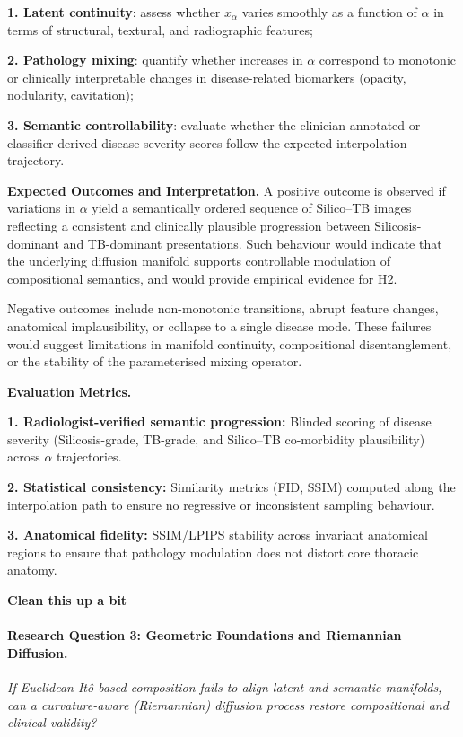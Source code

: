\textbf{1. Latent continuity}: assess whether \(x_{\alpha}\) varies smoothly as a function of \(\alpha\) in terms of structural, textural, and radiographic features;

\textbf{2. Pathology mixing}: quantify whether increases in \(\alpha\) correspond to monotonic or clinically interpretable changes in disease-related biomarkers (opacity, nodularity, cavitation);

\textbf{3. Semantic controllability}: evaluate whether the clinician-annotated or classifier-derived disease severity scores follow the expected interpolation trajectory.

\textbf{Expected Outcomes and Interpretation.}
A positive outcome is observed if variations in \(\alpha\) yield a semantically ordered sequence of Silico--TB images reflecting a consistent and clinically plausible progression between Silicosis-dominant and TB-dominant presentations. 
Such behaviour would indicate that the underlying diffusion manifold supports controllable modulation of compositional semantics, and would provide empirical evidence for H2.

Negative outcomes include non-monotonic transitions, abrupt feature changes, anatomical implausibility, or collapse to a single disease mode. 
These failures would suggest limitations in manifold continuity, compositional disentanglement, or the stability of the parameterised mixing operator.

\textbf{Evaluation Metrics.}

\textbf{1. Radiologist-verified semantic progression:}
Blinded scoring of disease severity (Silicosis-grade, TB-grade, and Silico--TB co-morbidity plausibility) across \(\alpha\) trajectories.

\textbf{2. Statistical consistency:}
Similarity metrics (FID, SSIM) computed along the interpolation path to ensure no regressive or inconsistent sampling behaviour.

\textbf{3. Anatomical fidelity:}
SSIM/LPIPS stability across invariant anatomical regions to ensure that pathology modulation does not distort core thoracic anatomy.


\textbf{Clean this up a bit}
\paragraph{Research Question 3: Geometric Foundations and Riemannian Diffusion.}
\emph{If Euclidean Itô-based composition fails to align latent and semantic manifolds, can a curvature-aware (Riemannian) diffusion process restore compositional and clinical validity?}

